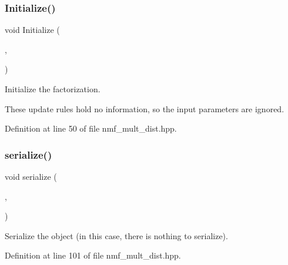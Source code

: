 \subsubsection{Initialize()}
{\footnotesize\ttfamily void Initialize (\begin{DoxyParamCaption}\item[{const Mat\+Type \&}]{,  }\item[{const size\+\_\+t}]{ }\end{DoxyParamCaption})\hspace{0.3cm}{\ttfamily [inline]}}



Initialize the factorization. 

These update rules hold no information, so the input parameters are ignored. 

Definition at line 50 of file nmf\+\_\+mult\+\_\+dist.\+hpp.

\mbox{\label{classmlpack_1_1amf_1_1NMFMultiplicativeDistanceUpdate_aa2ccb5a0533a6ba0abe6dfc1f98fbafb}} 
\subsubsection{serialize()}
{\footnotesize\ttfamily void serialize (\begin{DoxyParamCaption}\item[{Archive \&}]{,  }\item[{const uint32\+\_\+t}]{ }\end{DoxyParamCaption})\hspace{0.3cm}{\ttfamily [inline]}}



Serialize the object (in this case, there is nothing to serialize). 



Definition at line 101 of file nmf\+\_\+mult\+\_\+dist.\+hpp.

\mbox{\label{classmlpack_1_1amf_1_1NMFMultiplicativeDistanceUpdate_a79b17bfdd69326a4f9f7d17c698ee6af}} 
